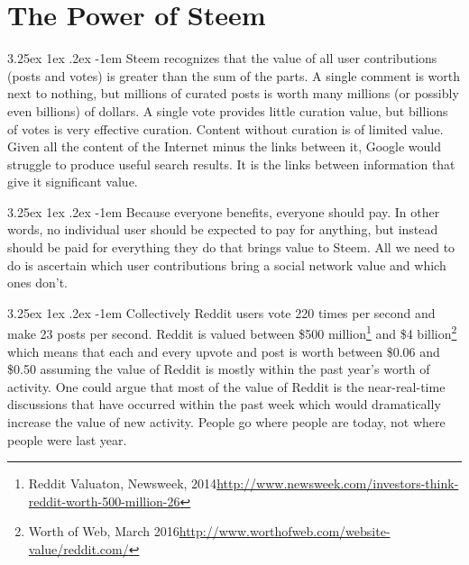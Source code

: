 \documentclass{article}
\makeatletter
\renewcommand\paragraph{\@startsection{paragraph}{5}{\z@}%
  {3.25ex \@plus1ex \@minus.2ex}%
  {-1em}%
  {\normalfont\normalsize\bfseries}}
\makeatother
\begin{document}
	\section{The Power of Steem}

		\paragraph{}
			Steem recognizes that the value of all user contributions (posts and votes) is greater than the sum of the parts. A single comment is worth next to nothing, but millions of curated posts is worth many millions (or possibly even billions) of dollars. A single vote provides little curation value, but billions of votes is very effective curation. Content without curation is of limited value. Given all the content of the Internet minus the links between it, Google would struggle to produce useful search results. It is the links between information that give it significant value.

		\paragraph{}
			Because everyone benefits, everyone should pay. In other words, no individual user should be expected to pay for anything, but instead should be paid for everything they do that brings value to Steem. All we need to do is ascertain which user contributions bring a social network value and which ones don't.

		\paragraph{}
			Collectively Reddit users vote 220 times per second and make 23 posts per second. Reddit is valued between \$500 million\footnote{Reddit Valuaton, Newsweek, 2014\newline\url{http://www.newsweek.com/investors-think-reddit-worth-500-million-26}} and \$4 billion\footnote{Worth of Web, March 2016\newline\url{http://www.worthofweb.com/website-value/reddit.com/}} which means that each and every upvote and post is worth between \$0.06 and \$0.50 assuming the value of Reddit is mostly within the past year's worth of activity. One could argue that most of the value of Reddit is the near-real-time discussions that have occurred within the past week which would dramatically increase the value of new activity. People go where people are today, not where people were last year.
\end{document}
